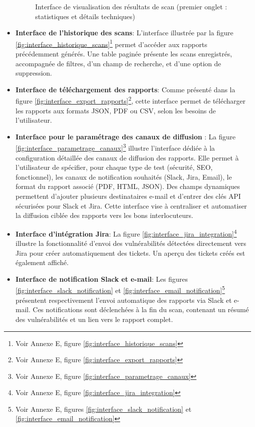 \begin{itemize}[label=$\bullet$]
\begin{figure}[H]
            \caption{\centering Interface de visualisation des résultats de scan (premier onglet : statistiques et détails techniques)}
            \label{fig:interface_resultats_scan}
        \end{figure}
        \vspace{-0.2cm}
    \item \textbf{Interface de l’historique des scans}:
    L’interface illustrée par la figure \ref{fig:interface_historique_scans}\footnote{Voir Annexe E, figure \ref{fig:interface_historique_scans}} permet d’accéder aux rapports précédemment générés. Une table paginée présente les scans enregistrés, accompagnée de filtres, d’un champ de recherche, et d’une option de suppression.
    
    \item \textbf{Interface de téléchargement des rapports}:
    Comme présenté dans la figure \ref{fig:interface_export_rapports}\footnote{Voir Annexe E, figure \ref{fig:interface_export_rapports}}, cette interface permet de télécharger les rapports aux formats JSON, PDF ou CSV, selon les besoins de l’utilisateur.


    \item \textbf{Interface pour le paramétrage des canaux de diffusion} : La figure \ref{fig:interface_parametrage_canaux}\footnote{Voir Annexe E, figure \ref{fig:interface_parametrage_canaux}} illustre l’interface dédiée à la configuration détaillée des canaux de diffusion des rapports. Elle permet à l’utilisateur de spécifier, pour chaque type de test (sécurité, SEO, fonctionnel), les canaux de notification souhaités (Slack, Jira, Email), le format du rapport associé (PDF, HTML, JSON). Des champs dynamiques permettent d’ajouter plusieurs destinataires e-mail et d’entrer des clés API sécurisées pour Slack et Jira. Cette interface vise à centraliser et automatiser la diffusion ciblée des rapports vers les bons interlocuteurs.

    \item \textbf{Interface d’intégration Jira}:
    La figure \ref{fig:interface_jira_integration}\footnote{Voir Annexe E, figure \ref{fig:interface_jira_integration}} illustre la fonctionnalité d’envoi des vulnérabilités détectées directement vers Jira pour créer automatiquement des tickets. Un aperçu des tickets créés est également affiché.
    
    \item \textbf{Interface de notification Slack et e-mail}:
    Les figures \ref{fig:interface_slack_notification} et \ref{fig:interface_email_notification}\footnote{Voir Annexe E, figures \ref{fig:interface_slack_notification} et \ref{fig:interface_email_notification}} présentent respectivement l’envoi automatique des rapports via Slack et e-mail. Ces notifications sont déclenchées à la fin du scan, contenant un résumé des vulnérabilités et un lien vers le rapport complet.
    

\end{itemize}
